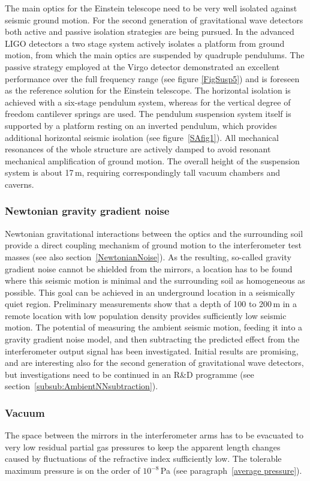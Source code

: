 The main optics for the Einstein telescope need to be very well isolated against 
seismic ground motion. For the second generation of gravitational wave detectors 
both active and passive isolation strategies are being pursued. In the advanced 
LIGO detectors a two stage system actively isolates a platform from ground 
motion, from which the main optics are suspended by quadruple pendulums. The 
passive strategy employed at the Virgo detector demonstrated an excellent 
performance over the full frequency range (see figure \ref{FigSusp5}) and is foreseen 
as the reference solution for the Einstein telescope. The horizontal isolation is 
achieved with a six-stage pendulum system, whereas for the vertical degree of 
freedom cantilever springs  are used. The pendulum suspension system itself is 
supported by a platform resting on an inverted pendulum, which provides 
additional horizontal seismic isolation (see figure~\ref{SAfig1}). All mechanical 
resonances of the whole structure are actively damped to avoid resonant 
mechanical amplification of ground motion. The overall height of the suspension 
system is about 17\,m, requiring correspondingly tall vacuum chambers and caverns.

\subsubsection{Newtonian gravity gradient noise}
Newtonian gravitational interactions between the optics and the surrounding soil 
provide a direct coupling mechanism of ground motion to the interferometer test 
masses (see also section~\ref{NewtonianNoise}). As the resulting, so-called 
gravity gradient noise cannot be shielded from the mirrors, a location has to be 
found where this seismic motion is minimal and the surrounding soil as 
homogeneous as possible. This goal can be achieved in an underground location 
in a seismically quiet region. Preliminary measurements show that a depth of 100 to 
200\,m in a remote location with low population density provides sufficiently low 
seismic motion. The potential of measuring the ambient seismic motion, feeding 
it into a gravity gradient noise model, and then subtracting the predicted effect 
from the interferometer output signal has been investigated. Initial results are 
promising, and are interesting also for the second generation of gravitational 
wave detectors, but investigations need to be continued in an R\&D programme 
(see section~\ref{subsub:AmbientNNsubtraction}).

\subsubsection{Vacuum}
The space between the mirrors in the interferometer arms has to be evacuated 
to very low residual partial gas pressures to keep the apparent length changes 
caused by fluctuations of the refractive index sufficiently low. The tolerable 
maximum pressure is on the order of $10^{-8}$\,Pa (see paragraph~\ref{average pressure}).
 
